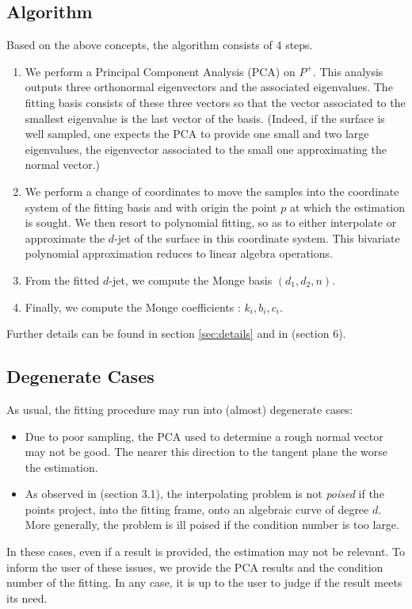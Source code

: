 \subsection{Algorithm}
%
Based on the above concepts, the algorithm consists of 4 steps.
%
\begin{enumerate}
\item
We perform a Principal Component Analysis (PCA) on $P^+$. This
analysis outputs three orthonormal eigenvectors and the associated
eigenvalues.  The fitting basis consists of these three vectors so
that the vector associated to the smallest eigenvalue is the last
vector of the basis. (Indeed, if the surface is well sampled, one
expects the PCA to provide one small and two large eigenvalues, the
eigenvector associated to the small one approximating the normal
vector.)
\item
We perform a change of coordinates to move the samples into the
coordinate system of the fitting basis and with origin the point $p$
at which the estimation is sought. We then resort to polynomial
fitting, so as to either interpolate or approximate the $d$-jet of the
surface in this coordinate system. This bivariate polynomial
approximation reduces to linear algebra operations.
\item
From the fitted $d$-jet, we compute the Monge basis $(d_1,d_2,n)$.
\item
Finally, we compute the Monge coefficients : $k_i, b_i, c_i$.
\end{enumerate}

Further details can be found in section \ref{sec:details} and in
\cite{cgal:cp-edqpf-05} (section 6).

\subsection{Degenerate Cases}
\label{sec:deg-cases}

As usual, the  fitting procedure may run into (almost) degenerate
cases:
\begin{itemize}
\item Due to poor sampling, the PCA used to determine a rough normal
  vector may not be good. The nearer this direction to the tangent
  plane the worse the estimation.

\item As observed in \cite{cgal:cp-edqpf-05} (section 3.1), the
  interpolating problem is not {\em poised} if the points project,
  into the fitting frame, onto an algebraic curve of degree $d$. More
  generally, the problem is ill poised if the condition number is too
  large.
\end{itemize}
In these cases, even if a result is provided, the estimation may not
be relevant. To inform the user of these issues, we provide the PCA
results and the condition number of the fitting. In any case, it is up
to the user to judge if the result meets its need.


